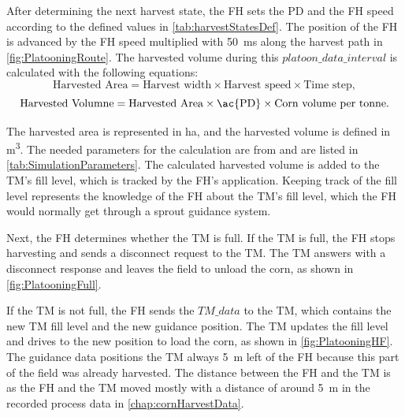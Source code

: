 After determining the next harvest state, the \ac{FH} sets the \ac{PD} and the \ac{FH} speed according to the defined values in
\autoref{tab:harvestStatesDef}.
The position of the \ac{FH} is advanced by the \ac{FH} speed multiplied with \SI{50}{\milli\second} along the
harvest path in \autoref{fig:PlatooningRoute}.
The harvested volume during this $platoon\_data\_interval$ is calculated with the following
equations:
\begin{equation}
   \label{eq:AreaCalculation}
   \text{Harvested Area} =
      \text{Harvest width} \times \text{Harvest speed} \times \text{Time step}
   ,
\end{equation}
\begin{equation}
   \label{eq:VolumneCalculation}
   \text{Harvested Volumne} =
   \text{Harvested Area} \times \text{\ac{PD}} \times \text{Corn volume per tonne}.
\end{equation}

The harvested area is represented in \si{\hectare}, and
the harvested volume is defined in \si{\cubic\metre}.
The needed parameters for the calculation are from \cite{faustzahlen2018} and are listed in \autoref{tab:SimulationParameters}.
The calculated harvested volume is added to the \ac{TM}'s fill level, which is tracked by the \ac{FH}'s application.
Keeping track of the fill level represents the knowledge of the \ac{FH} about the \ac{TM}'s fill level, which the \ac{FH} would
normally get through a sprout guidance system.

Next, the \ac{FH} determines whether the \ac{TM} is full.
If the \ac{TM} is full, the \ac{FH} stops harvesting and sends a disconnect request to the \ac{TM}.
The \ac{TM} answers with a disconnect response and leaves the field to unload the corn, as shown in \autoref{fig:PlatooningFull}.



If the \ac{TM} is not full, the \ac{FH} sends the $TM\_data$ to the \ac{TM},
which contains the new \ac{TM} fill level and the new guidance position.
The \ac{TM} updates the fill level and drives to the new position to load the corn, as shown in \autoref{fig:PlatooningHF}.
The guidance data positions the \ac{TM} always \SI{5}{\metre} left of the \ac{FH} because this part of the field was already harvested.
The distance between the \ac{FH} and the \ac{TM} is  as the \ac{FH} and the \ac{TM} moved mostly with a distance of around \SI{5}{\metre} in
the recorded process data in \autoref{chap:cornHarvestData}.

